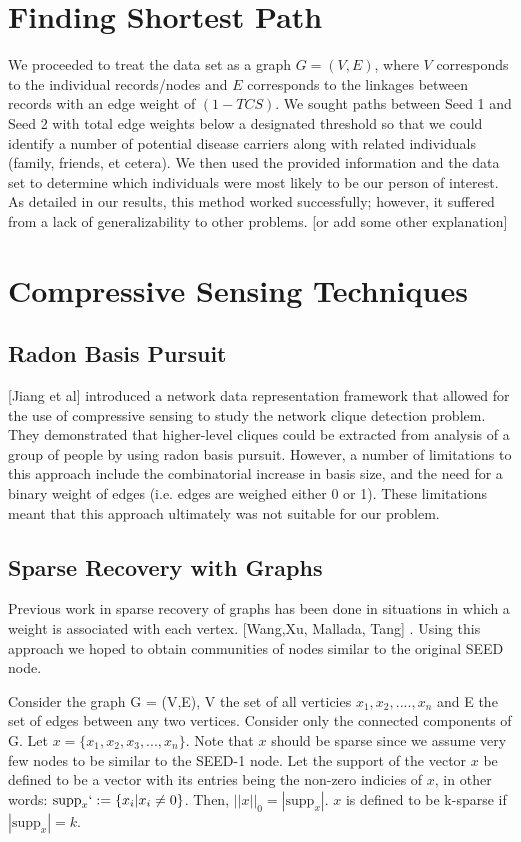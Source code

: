 \documentclass{article} %
\begin{document}
\section{Finding Shortest Path}
We proceeded to treat the data set as a graph $G = (V,E)$, where $V$ corresponds to the individual records/nodes and $E$ corresponds to the linkages between records with an edge weight of $(1-TCS)$. We sought paths between Seed 1 and Seed 2 with total edge weights below a designated threshold so that we could identify a number of potential disease carriers along with related individuals (family, friends, et cetera). We then used the provided information and the data set to determine which individuals were most likely to be our person of interest. As detailed in our results, this method worked successfully; however, it suffered from a lack of generalizability to other problems. [or add some other explanation]




\section{Compressive Sensing Techniques}


\subsection{Radon Basis Pursuit}
[Jiang et al] introduced a network data representation framework that allowed for the use of compressive sensing to study the network clique detection problem. They demonstrated that higher-level cliques could be extracted from analysis of a group of people by using radon basis pursuit. However, a number of limitations to this approach include the combinatorial increase in basis size, and the need for a binary weight of edges (i.e. edges are weighed either 0 or 1). These limitations meant that this approach ultimately was not suitable for our problem. 

\subsection{Sparse Recovery with Graphs}
Previous work in sparse recovery of graphs has been done in situations in which a weight is associated with each vertex. [Wang,Xu, Mallada, Tang] . Using this approach we hoped to obtain communities of nodes similar to the original SEED node. 

Consider the graph G = (V,E),  V  the set of all verticies $x_1 , x_2 , .... , x_n$  and E the set of edges between any two vertices. Consider only the connected components of G. Let $x = \{x_1, x_2, x_3, ... , x_n\}$. Note that $x$ should be sparse  since we assume very few nodes to be similar to the SEED-1 node. 
Let the support of the vector $x$ be defined to be a vector with its entries being the non-zero indicies of $x$, in other words: $\textrm{supp}_x `:=\{x_i | x_i \neq  0\}$. Then, $||x||_0 = |\textrm{supp}_x|$. $x$ is defined to be k-sparse if $ |\textrm{supp}_x| = k$.
\end{document}

